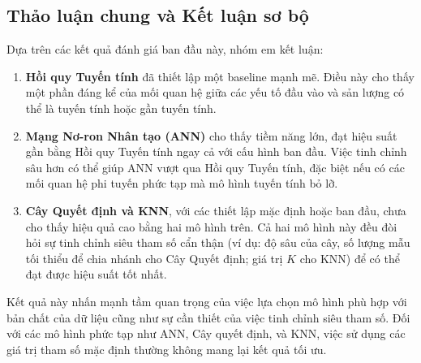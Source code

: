 \subsection{Thảo luận chung và Kết luận sơ bộ}
\label{subsec:overall_discussion_preliminary_conclusion}

Dựa trên các kết quả đánh giá ban đầu này, nhóm em kết luận:
\begin{enumerate}
    \item \textbf{Hồi quy Tuyến tính} đã thiết lập một baseline mạnh mẽ. Điều này cho thấy một phần đáng kể của mối quan hệ giữa các yếu tố đầu vào và sản lượng có thể là tuyến tính hoặc gần tuyến tính.
    \item \textbf{Mạng Nơ-ron Nhân tạo (ANN)} cho thấy tiềm năng lớn, đạt hiệu suất gần bằng Hồi quy Tuyến tính ngay cả với cấu hình ban đầu. Việc tinh chỉnh sâu hơn có thể giúp ANN vượt qua Hồi quy Tuyến tính, đặc biệt nếu có các mối quan hệ phi tuyến phức tạp mà mô hình tuyến tính bỏ lỡ.
    \item \textbf{Cây Quyết định và KNN}, với các thiết lập mặc định hoặc ban đầu, chưa cho thấy hiệu quả cao bằng hai mô hình trên. Cả hai mô hình này đều đòi hỏi sự tinh chỉnh siêu tham số cẩn thận (ví dụ: độ sâu của cây, số lượng mẫu tối thiểu để chia nhánh cho Cây Quyết định; giá trị $K$ cho KNN) để có thể đạt được hiệu suất tốt nhất.
\end{enumerate}

Kết quả này nhấn mạnh tầm quan trọng của việc lựa chọn mô hình phù hợp với bản chất của dữ liệu cũng như sự cần thiết của việc tinh chỉnh siêu tham số. Đối với các mô hình phức tạp như ANN, Cây quyết định, và KNN, việc sử dụng các giá trị tham số mặc định thường không mang lại kết quả tối ưu.

